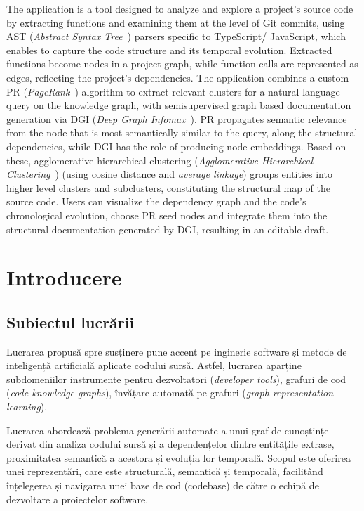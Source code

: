 \documentclass[12pt]{article}
\numberwithin{equation}{section}
\numberwithin{figure}{section}
\numberwithin{table}{section}
\theoremstyle{definition}
\theoremstyle{plain}
\begin{document}
The application is a tool designed to analyze and explore a project's source code by extracting functions and examining them at the level of Git commits, using AST (\textit{Abstract Syntax Tree}~\cite{aho2006compilers}) parsers specific to TypeScript/ JavaScript, which enables to capture the code structure and its temporal evolution. Extracted functions become nodes in a project graph, while function calls are represented as edges, reflecting the project's dependencies. The application combines a custom PR (\textit{PageRank}~\cite{page1999pagerank}) algorithm to extract relevant clusters for a natural language query on the knowledge graph, with semisupervised graph based documentation generation via DGI (\textit{Deep Graph Infomax}~\cite{velickovic2019dgi}). PR propagates semantic relevance from the node that is most semantically similar to the query, along the structural dependencies, while DGI has the role of producing node embeddings. Based on these, agglomerative hierarchical clustering (\textit{Agglomerative Hierarchical Clustering}~\cite{ward1963hierarchical}) (using cosine distance and \textit{average linkage}) groups entities into higher level clusters and subclusters, constituting the structural map of the source code. Users can visualize the dependency graph and the code's chronological evolution, choose PR seed nodes and integrate them into the structural documentation generated by DGI, resulting in an editable draft.

\clearpage
\tableofcontents
\clearpage

\pagestyle{plain}

\section{Introducere}

\subsection{Subiectul lucrării}

Lucrarea propusă spre susținere pune accent pe inginerie software și metode de inteligență artificială aplicate codului sursă. Astfel, lucrarea aparține subdomeniilor instrumente pentru dezvoltatori (\textit{developer tools}), grafuri de cod (\textit{code knowledge graphs}), învățare automată pe grafuri (\textit{graph representation learning}).

Lucrarea abordează problema generării automate a unui graf de cunoștințe derivat din analiza codului sursă și a dependențelor dintre entitățile extrase, proximitatea semantică a acestora și evoluția lor temporală. Scopul este oferirea unei reprezentări, care este structurală, semantică și temporală, facilitând înțelegerea și navigarea unei baze de cod (codebase) de către o echipă de dezvoltare a proiectelor software.
\end{document}
